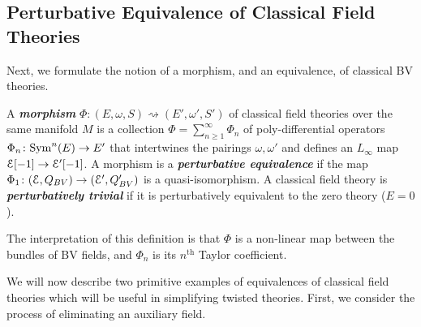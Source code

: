 \documentclass[10pt, oneside]{article}
\newcommand{\defterm}[1]{\textbf{\emph{#1}}}
\begin{document}
\subsection{Perturbative Equivalence of Classical Field Theories}

Next, we formulate the notion of a morphism, and an equivalence, of classical BV theories. 

\begin{definition}
A \defterm{morphism} $\Phi\colon (E, \omega, S)\rightsquigarrow (E', \omega', S')$ of classical field theories over the same manifold $M$ is a collection $\Phi =\sum_{n\geq 1}^\infty \Phi_n$ of poly-differential operators $\Phi_n\colon {\rm Sym}^n(E)\rightarrow E'$ that intertwines the pairings $\omega, \omega'$ and defines an $L_\infty$ map $\mathcal E[-1]\rightarrow \mathcal E'[-1]$. A morphism is a \defterm{perturbative equivalence} if the map $\Phi_1\colon (\mathcal E, Q_{BV})\rightarrow (\mathcal E', Q'_{BV})$ is a quasi-isomorphism. A classical field theory is \defterm{perturbatively trivial} if it is perturbatively equivalent to the zero theory ($E = 0$).
\label{def:perturbativeequivalence}
\end{definition}

The interpretation of this definition is that $\Phi$ is a non-linear map between the bundles of BV fields, and $\Phi_n$ is its $n^{\text{th}}$ Taylor coefficient.

We will now describe two primitive examples of equivalences of classical field theories which will be useful in simplifying twisted theories. 
First, we consider the process of eliminating an auxiliary field.
\end{document}
